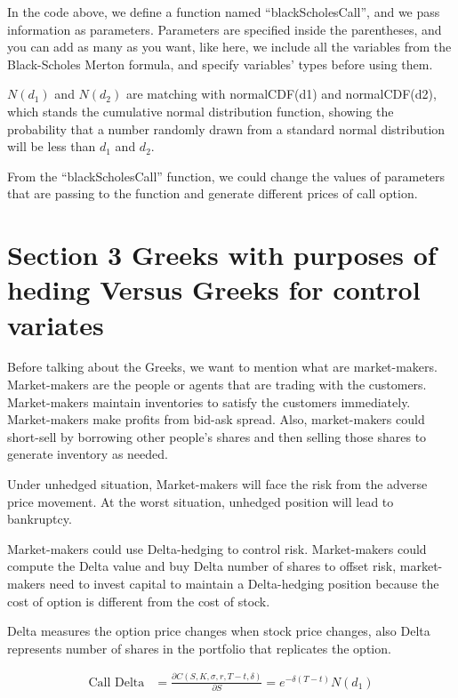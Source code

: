 \documentclass[11pt,]{article}
\begin{document}
In the code above, we define a function named ``blackScholesCall'', and
we pass information as parameters. Parameters are specified inside the
parentheses, and you can add as many as you want, like here, we include
all the variables from the Black-Scholes Merton formula, and specify
variables' types before using them.

\(N(d_1)\) and \(N(d_2)\) are matching with normalCDF(d1) and
normalCDF(d2), which stands the cumulative normal distribution function,
showing the probability that a number randomly drawn from a standard
normal distribution will be less than \(d_1\) and \(d_2\).

From the ``blackScholesCall'' function, we could change the values of
parameters that are passing to the function and generate different
prices of call option.

\hypertarget{section-3-greeks-with-purposes-of-heding-versus-greeks-for-control-variates}{%
\section{Section 3 Greeks with purposes of heding Versus Greeks for
control
variates}\label{section-3-greeks-with-purposes-of-heding-versus-greeks-for-control-variates}}

Before talking about the Greeks, we want to mention what are
market-makers. Market-makers are the people or agents that are trading
with the customers. Market-makers maintain inventories to satisfy the
customers immediately. Market-makers make profits from bid-ask spread.
Also, market-makers could short-sell by borrowing other people's shares
and then selling those shares to generate inventory as needed.

Under unhedged situation, Market-makers will face the risk from the
adverse price movement. At the worst situation, unhedged position will
lead to bankruptcy.

Market-makers could use Delta-hedging to control risk. Market-makers
could compute the Delta value and buy Delta number of shares to offset
risk, market-makers need to invest capital to maintain a Delta-hedging
position because the cost of option is different from the cost of stock.

Delta measures the option price changes when stock price changes, also
Delta represents number of shares in the portfolio that replicates the
option.

\[
\begin{align}
\mbox{Call Delta} &= \frac{\partial C(S, K, \sigma, r, T - t, \delta)}{\partial S} = e^{-\delta (T - t)} N(d_{1}) 
\end{align}
\]
\end{document}
